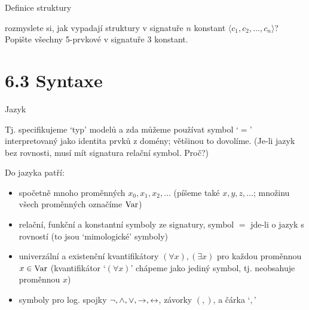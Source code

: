 \documentclass{beamer}
\begin{document}
\begin{frame}{Definice struktury}
    

    \medskip

     rozmyslete si, jak vypadají struktury v \alert{signatuře $n$ konstant} $\langle c_1,c_2,\dots,c_n\rangle$? Popište všechny 5-prvkové v signatuře 3 konstant. 

\end{frame}


\section{6.3 Syntaxe}


\begin{frame}{Jazyk}


    Tj. specifikujeme `typ' modelů a zda můžeme používat symbol `\alert{$=$}' interpretovaný jako \alert{identita} prvků z domény; většinou to dovolíme. (Je-li jazyk bez  rovnosti, musí mít signatura relační symbol. Proč?)
    
    Do jazyka patří:
    \begin{itemize}
        \item spočetně mnoho \alert{proměnných} $x_0,x_1,x_2,\dots$ (píšeme také $x,y,z,\dots$; množinu všech proměnných označíme \alert{$\operatorname{Var}$})
        \item \alert{relační}, \alert{funkční} a \alert{konstantní symboly} ze signatury, symbol \alert{$=$} jde-li o jazyk s rovností (to jsou `\alert{mimologické}' symboly)
        \item \alert{univerzální} a \alert{existenční} \alert{kvantifikátory} $(\forall x),(\exists x)$ pro každou proměnnou $x\in\operatorname{Var}$ (kvantifikátor `$(\forall x)$' chápeme jako jediný symbol, tj. \alert{neobsahuje} proměnnou $x$)
        \item symboly pro log. spojky \alert{\( \neg,{\land},{\lor}, {\mathbin{\rightarrow}}, {\mathbin{\leftrightarrow}} \)}, závorky \alert{\( (,) \)}, a čárka `\alert{$,$}'
    \end{itemize}

\end{frame}
\end{document}
